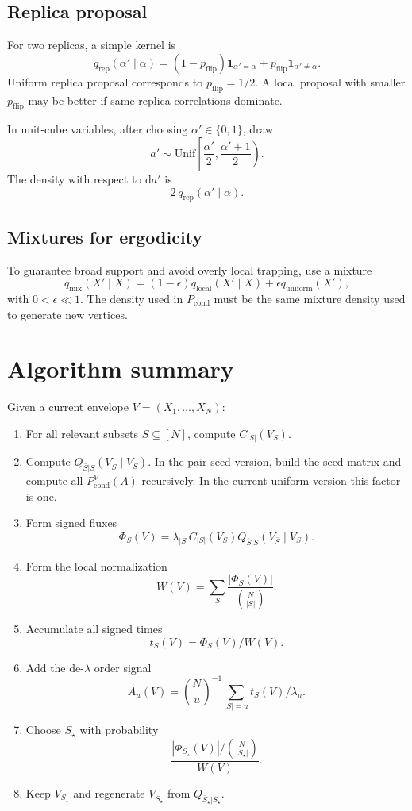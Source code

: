 \documentclass[11pt]{article}
\newcommand{\dd}{\mathrm{d}}
\newcommand{\1}{\mathbf{1}}
\newcommand{\Pcond}{P_{\mathrm{cond}}}
\newcommand{\card}[1]{\left|#1\right|}
\begin{document}
\subsection{Replica proposal}

For two replicas, a simple kernel is
\[
  q_{\mathrm{rep}}(\alpha'\mid\alpha)
  =
  (1-p_{\mathrm{flip}})\1_{\alpha'=\alpha}
  +
  p_{\mathrm{flip}}\1_{\alpha'\ne\alpha}.
\]
Uniform replica proposal corresponds to \(p_{\mathrm{flip}}=1/2\).  A local
proposal with smaller \(p_{\mathrm{flip}}\) may be better if same-replica
correlations dominate.

In unit-cube variables, after choosing \(\alpha'\in\{0,1\}\), draw
\[
  a'\sim \mathrm{Unif}\left[\frac{\alpha'}{2},\frac{\alpha'+1}{2}\right).
\]
The density with respect to \(\dd a'\) is
\[
  2\,q_{\mathrm{rep}}(\alpha'\mid\alpha).
\]

\subsection{Mixtures for ergodicity}

To guarantee broad support and avoid overly local trapping, use a mixture
\[
  q_{\mathrm{mix}}(X'\mid X)
  =
  (1-\epsilon)q_{\mathrm{local}}(X'\mid X)
  +
  \epsilon q_{\mathrm{uniform}}(X'),
\]
with \(0<\epsilon\ll 1\).  The density used in \(\Pcond\) must be the same
mixture density used to generate new vertices.

\section{Algorithm summary}

Given a current envelope \(V=(X_1,\ldots,X_N)\):

\begin{enumerate}[leftmargin=2em]
  \item For all relevant subsets \(S\subseteq[N]\), compute
  \(C_{\card{S}}(V_S)\).
  \item Compute \(Q_{\bar S|S}(V_{\bar S}\mid V_S)\).  In the pair-seed
  version, build the seed matrix and compute all \(\Pcond^V(A)\) recursively.
  In the current uniform version this factor is one.
  \item Form signed fluxes
  \[
    \Phi_S(V)=\lambda_{\card{S}}C_{\card{S}}(V_S)Q_{\bar S|S}(V_{\bar S}\mid V_S).
  \]
  \item Form the local normalization
  \[
    W(V)=\sum_S \frac{|\Phi_S(V)|}{\binom{N}{\card{S}}}.
  \]
  \item Accumulate all signed times
  \[
    t_S(V)=\Phi_S(V)/W(V).
  \]
  \item Add the de-\(\lambda\) order signal
  \[
    A_u(V)=\binom{N}{u}^{-1}\sum_{\card{S}=u}t_S(V)/\lambda_u.
  \]
  \item Choose \(S_\star\) with probability
  \[
    \frac{|\Phi_{S_\star}(V)|/\binom{N}{\card{S_\star}}}{W(V)}.
  \]
  \item Keep \(V_{S_\star}\) and regenerate \(V_{\bar S_\star}\) from
  \(Q_{\bar S_\star|S_\star}\).
\end{enumerate}
\end{document}
